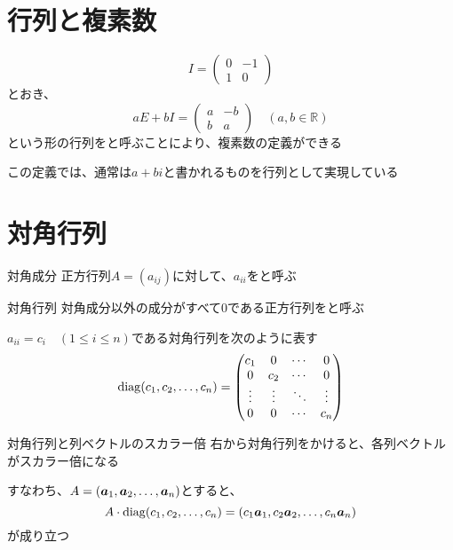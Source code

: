 \documentclass[../../../topic_linear-algebra]{subfiles}
\begin{document}
\sectionline
\section{行列と複素数}

\begin{equation*}
  I = \begin{pmatrix}
    0 & -1 \\
    1 & 0
  \end{pmatrix}
\end{equation*}
とおき、
\begin{equation*}
  aE + bI = \begin{pmatrix}
    a & -b \\
    b & a
  \end{pmatrix} \quad (a, b \in \mathbb{R})
\end{equation*}
という形の行列をと呼ぶことにより、複素数の定義ができる

この定義では、通常は$a + bi$と書かれるものを行列として実現している

\br

\sectionline
\section{対角行列}

\begin{definition}{対角成分}
  正方行列$A = (a_{ij})$に対して、$a_{ii}$をと呼ぶ
\end{definition}

\begin{definition}{対角行列}
  対角成分以外の成分がすべて0である正方行列をと呼ぶ

  $a_{ii} = c_i \quad (1 \leq i \leq n)$である対角行列を次のように表す
  \begin{equation*}
    \operatorname{diag}(c_1, c_2, \ldots, c_n) = \begin{pmatrix}
      c_1    & 0      & \cdots & 0      \\
      0      & c_2    & \cdots & 0      \\
      \vdots & \vdots & \ddots & \vdots \\
      0      & 0      & \cdots & c_n
    \end{pmatrix}
  \end{equation*}
\end{definition}

\begin{theorem}{対角行列と列ベクトルのスカラー倍}
  右から対角行列をかけると、各列ベクトルがスカラー倍になる

  すなわち、$A = (\vb*{a}_1, \vb*{a}_2, \ldots, \vb*{a}_n)$とすると、
  \begin{equation*}
    A \cdot \operatorname{diag}(c_1, c_2, \ldots, c_n) = (c_1\vb*{a}_1, c_2\vb*{a}_2, \ldots, c_n\vb*{a}_n)
  \end{equation*}
  が成り立つ
\end{theorem}
\end{document}
